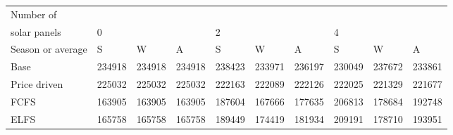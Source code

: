 \begin{table}[h] 
\centering 
\begin{tabular}{l|lll|lll|lll}Number of \\ solar panels&0& & &2& & &4& & \\ \hline 
Season or average & S & W & A & S & W & A & S & W & A \\ \hline 
Base&234918&234918&234918&238423&233971&236197&230049&237672&233861 \\ 
Price driven&225032&225032&225032&222163&222089&222126&222025&221329&221677 \\ 
FCFS&163905&163905&163905&187604&167666&177635&206813&178684&192748 \\ 
ELFS&165758&165758&165758&189449&174419&181934&209191&178710&193951 \\ 
\end{tabular} 
\end{table}